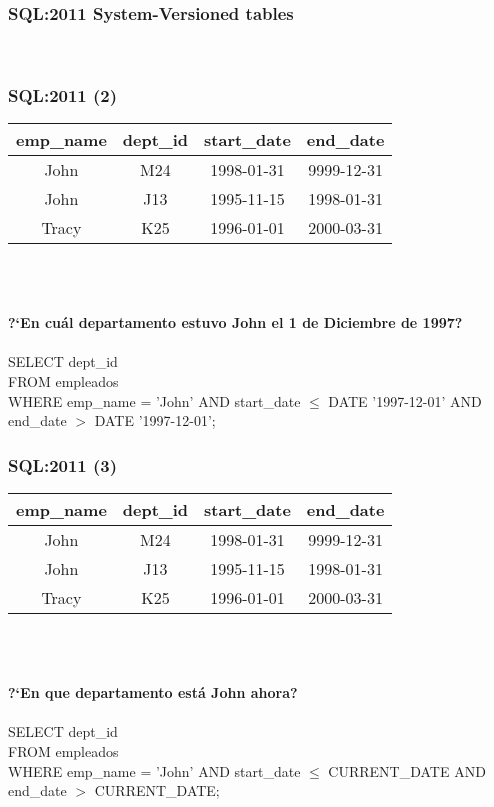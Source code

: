 \documentclass[12pt]{beamer}
\begin{document}
\begin{frame}
\frametitle{SQL:2011 System-Versioned tables}
\ \\
\end{frame}

\begin{frame}
\frametitle{SQL:2011 (2)}
\begin{center}
\begin{tabular}{|c|c|c|c|}
\hline
emp\_name & dept\_id & start\_date & end\_date\\
\hline
John & M24 & 1998-01-31 & 9999-12-31\\
\hline
John & J13 & 1995-11-15 & 1998-01-31\\
\hline
Tracy & K25 & 1996-01-01 & 2000-03-31\\
\hline
\end{tabular}\\
\end{center}
\ \\

\textbf{?`En cu\'al departamento estuvo John el 1 de Diciembre de 1997?}\\
\ \\
SELECT dept\_id\\
FROM empleados\\
WHERE emp\_name = 'John' AND start\_date $\leq$ DATE '1997-12-01' AND end\_date $>$ DATE '1997-12-01';


\end{frame}

\begin{frame}
\frametitle{SQL:2011 (3)}
\begin{center}
\begin{tabular}{|c|c|c|c|}
\hline
emp\_name & dept\_id & start\_date & end\_date\\
\hline
John & M24 & 1998-01-31 & 9999-12-31\\
\hline
John & J13 & 1995-11-15 & 1998-01-31\\
\hline
Tracy & K25 & 1996-01-01 & 2000-03-31\\
\hline
\end{tabular}\\
\end{center}
\ \\

\textbf{?`En que departamento est\'a John ahora?}\\
\ \\
SELECT dept\_id\\
FROM empleados\\
WHERE emp\_name = 'John' AND start\_date $\leq$ CURRENT\_DATE AND end\_date $>$ CURRENT\_DATE;

\end{frame}
\end{document}
